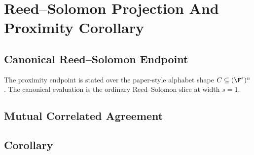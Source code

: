 \section{Reed--Solomon Projection And Proximity Corollary}

\subsection{Canonical Reed--Solomon Endpoint}

The proximity endpoint is stated over the paper-style alphabet shape
\(C \subseteq (\F^s)^n\). The canonical \HE{} evaluation is the ordinary
Reed--Solomon slice at width \(s = 1\).

\subsection{Mutual Correlated Agreement}


\subsection{Corollary}

